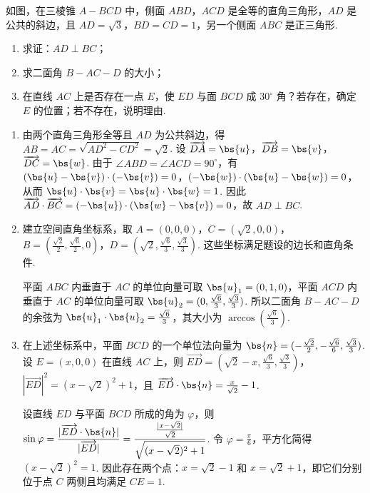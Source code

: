 \begin{problem}
如图，在三棱锥 \(A - BCD\) 中，侧面 \(ABD\)，\(ACD\) 是全等的直角三角形，\(AD\) 是公共的斜边，且 \(AD = \sqrt{3}\)，\(BD = CD = 1\)，另一个侧面 \(ABC\) 是正三角形.

\begin{enumerate}
\item 求证：\(AD \perp BC\)；
\item 求二面角 \(B - AC - D\) 的大小；
\item 在直线 \(AC\) 上是否存在一点 \(E\)，使 \(ED\) 与面 \(BCD\) 成 \(30^{\circ}\) 角？若存在，确定 \(E\) 的位置；若不存在，说明理由.
\end{enumerate}

\end{problem}

\begin{solution}
\begin{enumerate}
\item 由两个直角三角形全等且 \(AD\) 为公共斜边，得 \(AB=AC=\sqrt{AD^2-CD^2}=\sqrt2\). 设 \(\overrightarrow{DA}=\bs{u}\)，\(\overrightarrow{DB}=\bs{v}\)，\(\overrightarrow{DC}=\bs{w}\). 由于 \(\angle ABD=\angle ACD=90^\circ\)，有
\((\bs{u}-\bs{v})\cdot(-\bs{v})=0\)，\((-\bs{w})\cdot(\bs{u}-\bs{w})=0\)，从而 \(\bs{u}\cdot\bs{v}=\bs{u}\cdot\bs{w}=1\). 因此
\(\overrightarrow{AD}\cdot\overrightarrow{BC}=(-\bs{u})\cdot(\bs{w}-\bs{v})=0\)，故 \(AD\perp BC\).
\item 建立空间直角坐标系，取
\(A=(0,0,0)\)，\(C=(\sqrt2,0,0)\)，\(B=(\frac{\sqrt2}{2},\frac{\sqrt6}{2},0)\)，\(D=(\sqrt2,\frac{\sqrt6}{3},\frac{\sqrt3}{3})\). 这些坐标满足题设的边长和直角条件.

平面 \(ABC\) 内垂直于 \(AC\) 的单位向量可取 \(\bs{u}_1=(0,1,0)\)，平面 \(ACD\) 内垂直于 \(AC\) 的单位向量可取 \(\bs{u}_2=(0,\frac{\sqrt6}{3},\frac{\sqrt3}{3})\). 所以二面角 \(B-AC-D\) 的余弦为 \(\bs{u}_1\cdot\bs{u}_2=\frac{\sqrt6}{3}\)，其大小为 \(\arccos(\frac{\sqrt6}{3})\).
\item 在上述坐标系中，平面 \(BCD\) 的一个单位法向量为 \(\bs{n}=(-\frac{\sqrt2}{2},-\frac{\sqrt6}{6},\frac{\sqrt3}{3})\). 设 \(E=(x,0,0)\) 在直线 \(AC\) 上，则
\(\overrightarrow{ED}=(\sqrt2-x,\frac{\sqrt6}{3},\frac{\sqrt3}{3})\)，\(|\overrightarrow{ED}|^2=(x-\sqrt2)^2+1\)，且 \(\overrightarrow{ED}\cdot\bs{n}=\frac{x}{\sqrt2}-1\).

设直线 \(ED\) 与平面 \(BCD\) 所成的角为 \(\varphi\)，则
\(\sin\varphi=\dfrac{|\overrightarrow{ED}\cdot\bs{n}|}{|\overrightarrow{ED}|}=\dfrac{\frac{|x-\sqrt2|}{\sqrt2}}{\sqrt{(x-\sqrt2)^2+1}}\). 令 \(\varphi=\frac{\pi}{6}\)，平方化简得 \((x-\sqrt2)^2=1\). 因此存在两个点：\(x=\sqrt2-1\) 和 \(x=\sqrt2+1\)，即它们分别位于点 \(C\) 两侧且均满足 \(CE=1\).
\end{enumerate}
\end{solution}

